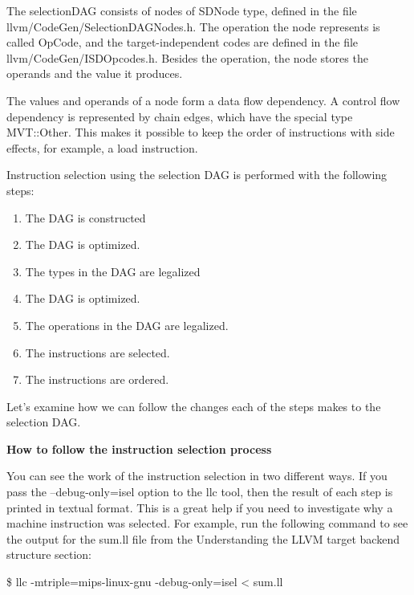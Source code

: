 The selectionDAG consists of nodes of SDNode type, defined in the file llvm/CodeGen/SelectionDAGNodes.h. The operation the node represents is called OpCode, and the target-independent codes are defined in the file llvm/CodeGen/ISDOpcodes.h. Besides the operation, the node stores the operands and the value it produces.\par

The values and operands of a node form a data flow dependency. A control flow dependency is represented by chain edges, which have the special type MVT::Other. This makes it possible to keep the order of instructions with side effects, for example, a load instruction.\par

Instruction selection using the selection DAG is performed with the following steps:\par

\begin{enumerate}
\item The DAG is constructed
\item The DAG is optimized.
\item The types in the DAG are legalized
\item The DAG is optimized.
\item The operations in the DAG are legalized.
\item The instructions are selected.
\item The instructions are ordered.
\end{enumerate}

Let's examine how we can follow the changes each of the steps makes to the selection DAG.\par

\hspace*{\fill} \par %
\textbf{How to follow the instruction selection process}

You can see the work of the instruction selection in two different ways. If you pass the –debug-only=isel option to the llc tool, then the result of each step is printed in textual format. This is a great help if you need to investigate why a machine instruction was selected. For example, run the following command to see the output for the sum.ll file from the Understanding the LLVM target backend structure section:\par

\begin{tcolorbox}[colback=white,colframe=black]
\$ llc -mtriple=mips-linux-gnu -debug-only=isel < sum.ll
\end{tcolorbox}

